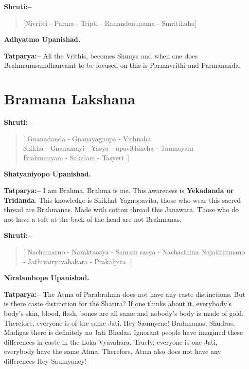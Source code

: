 \textbf{Shruti:–}

\begin{verse}
[Nivritti - Parma - Tripti - Ranandonupama - Smritihaha]
\end{verse}

\begin{flushright}
\textbf{Adhyatmo Upanishad.}
\end{flushright}

\textbf{Tatparya:–} All the Vrithis, becomes Shunya and when one does Brahmanusamdhanvamt to be focused on this is Parmavrithi and Parmananda.

\chapter{Bramana Lakshana}

\textbf{Shruti:–}

\begin{verse}
[ Gnanadanda - Gnanayagnopa - Vithnaha \\ Shikha - Gnanamayi - Yasya - upavithincha - Tanmayam \\ Brahmanyam - Sakalam - Tasyeti .]
\end{verse}

\begin{flushright}
\textbf{Shatyaniyopo Upanishad.}
\end{flushright}

\textbf{Tatparya:–} I am Brahma, Brahma is me. This awareness is \textbf{Yekadanda or Tridanda}. This knowledge is Shikhat Yagnopavita, those who wear this sacred thread are Brahmanas. Made with cotton thread this Janawara. Those who do not have a tuft at the back of the head are not Brahmanas.

\textbf{Shruti:–}

\begin{verse}
[ Nachamarno - Naraktaasya - Samam sasya - Nacha\break sthina  Najatiratmano - Jathivairyavahakara - Praka\break lpita .]
\end{verse}

\begin{flushright}
\textbf{Niralambopa Upanishad.}
\end{flushright}

\textbf{Tatparya:–} The Atma of Parabrahma does not have any caste distinctions. But is there caste distinction for the Sharira? If one thinks about it, everybody's body's skin, blood, flesh, bones are all same and nobody's body is made of gold. Therefore, everyone is of the same Jati. Hey Saumyene! Brahmanas, Shudras, Madigas there is definitely no Jati Bhedas. Ignorant people have imagined these differences in caste in the Loka Vyavahara. Truely, everyone is one Jati, everybody have the same Atma. Therefore, Atma also does not have any differences Hey Saumyaney!

